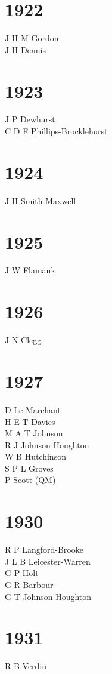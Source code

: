 \begin{multicols}{2}
  \section*{1922}
  J H M Gordon \\
  J H Dennis \\
  \section*{1923}
  J P Dewhurst \\
  C D F Phillips-Brocklehurst \\
  \section*{1924}
  J H Smith-Maxwell \\
  \section*{1925}
  J W Flamank \\
  \section*{1926}
  J N Clegg \\
  \section*{1927}
  D Le Marchant \\
  H E T Davies \\
  M A T Johnson \\
  R J Johnson Houghton \\
  W B Hutchinson \\
  S P L Groves \\
  P Scott (QM) \\
  \section*{1930}
  R P Langford-Brooke \\
  J L B Leicester-Warren \\
  G P Holt \\
  G R Barbour \\
  G T Johnson Houghton \\
  \section*{1931}
  R B Verdin \\

\end{multicols}
